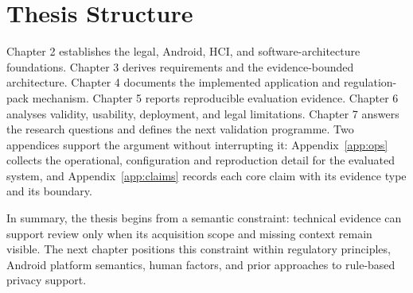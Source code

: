 \section{Thesis Structure}

Chapter 2 establishes the legal, Android, HCI, and software-architecture foundations. Chapter 3 derives requirements and the evidence-bounded architecture. Chapter 4 documents the implemented application and regulation-pack mechanism. Chapter 5 reports reproducible evaluation evidence. Chapter 6 analyses validity, usability, deployment, and legal limitations. Chapter 7 answers the research questions and defines the next validation programme. Two appendices support the argument without interrupting it: Appendix~\ref{app:ops} collects the operational, configuration and reproduction detail for the evaluated system, and Appendix~\ref{app:claims} records each core claim with its evidence type and its boundary.

In summary, the thesis begins from a semantic constraint: technical evidence can support review only when its acquisition scope and missing context remain visible. The next chapter positions this constraint within regulatory principles, Android platform semantics, human factors, and prior approaches to rule-based privacy support.
